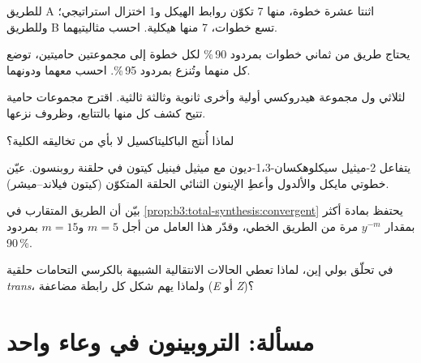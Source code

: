 \begin{exercise}[$\star\star$]\label{exo:b3:total-synthesis:6}
للطريق A اثنتا عشرة خطوة، منها 7 تكوّن روابط الهيكل و1 اختزال
استراتيجي؛ وللطريق B تسع خطوات، 7 منها هيكلية. احسب مثاليتيهما.
\end{exercise}

\begin{exercise}[$\star\star$]\label{exo:b3:total-synthesis:7}
يحتاج طريق من ثماني خطوات بمردود 90\,\% لكل خطوة إلى مجموعتين حاميتين، توضع كل منهما 
وتُنزع بمردود 95\,\%. احسب  معهما ودونهما.
\end{exercise}

\begin{exercise}[$\star\star$]\label{exo:b3:total-synthesis:8}
لثلاثي ول مجموعة هيدروكسي أولية وأخرى ثانوية وثالثة ثالثية. اقترح
مجموعات حامية تتيح كشف كل منها بالتتابع، وظروف
نزعها.
\end{exercise}

\begin{exercise}[$\star\star$]\label{exo:b3:total-synthesis:9}
لماذا أُنتج الباكليتاكسيل  لا بأي من تخاليقه
الكلية؟
\end{exercise}

\begin{exercise}[$\star\star\star$]\label{exo:b3:total-synthesis:10}
يتفاعل 2-ميثيل سيكلوهكسان-1،3-ديون مع ميثيل فينيل كيتون في حلقنة
روبنسون. عيّن خطوتي مايكل والألدول وأعطِ الإينون الثنائي الحلقة
المتكوّن (كيتون فيلاند--ميشر).
\end{exercise}

\begin{exercise}[$\star\star\star$]\label{exo:b3:total-synthesis:11}
بيّن أن الطريق المتقارب في \cref{prop:b3:total-synthesis:convergent} يحتفظ
بمادة أكثر بمقدار $y^{-m}$ مرة من الطريق الخطي، وقدّر هذا العامل من أجل $m = 5$ 
و$m = 15$ بمردود 90\,\%.
\end{exercise}

\begin{exercise}[$\star\star\star$]\label{exo:b3:total-synthesis:12}
في تحلّق بولي إين، لماذا تعطي الحالات الانتقالية الشبيهة بالكرسي التحامات حلقية \textit{trans}،
ولماذا يهم شكل كل رابطة مضاعفة (\textit{E} أو \textit{Z})؟
\end{exercise}

\section{مسألة: التروبينون في وعاء واحد}

